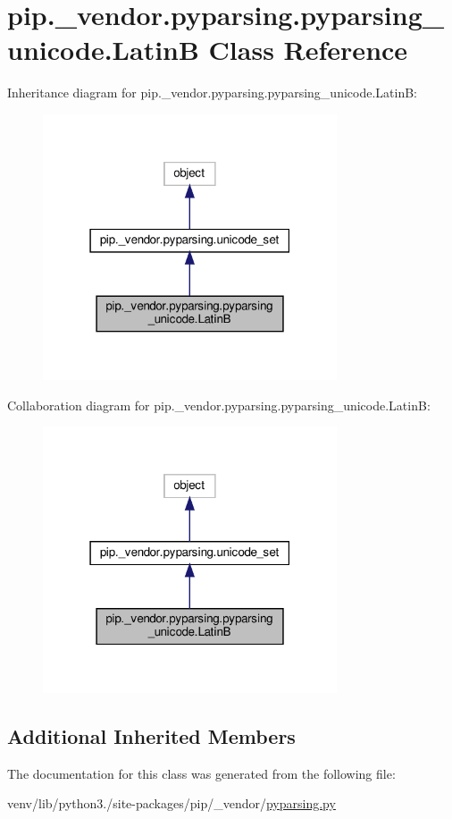 \hypertarget{classpip_1_1__vendor_1_1pyparsing_1_1pyparsing__unicode_1_1LatinB}{}\section{pip.\+\_\+vendor.\+pyparsing.\+pyparsing\+\_\+unicode.\+LatinB Class Reference}
\label{classpip_1_1__vendor_1_1pyparsing_1_1pyparsing__unicode_1_1LatinB}


Inheritance diagram for pip.\+\_\+vendor.\+pyparsing.\+pyparsing\+\_\+unicode.\+LatinB\+:
\nopagebreak
\begin{figure}[H]
\begin{center}
\leavevmode
\includegraphics[width=247pt]{classpip_1_1__vendor_1_1pyparsing_1_1pyparsing__unicode_1_1LatinB__inherit__graph}
\end{center}
\end{figure}


Collaboration diagram for pip.\+\_\+vendor.\+pyparsing.\+pyparsing\+\_\+unicode.\+LatinB\+:
\nopagebreak
\begin{figure}[H]
\begin{center}
\leavevmode
\includegraphics[width=247pt]{classpip_1_1__vendor_1_1pyparsing_1_1pyparsing__unicode_1_1LatinB__coll__graph}
\end{center}
\end{figure}
\subsection*{Additional Inherited Members}


The documentation for this class was generated from the following file\+:\begin{DoxyCompactItemize}
\item 
venv/lib/python3./site-\/packages/pip/\+\_\+vendor/\hyperlink{pip_2__vendor_2pyparsing_8py}{pyparsing.\+py}\end{DoxyCompactItemize}
